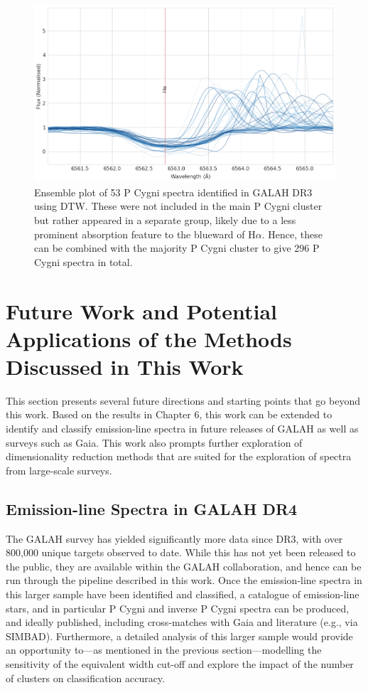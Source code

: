 \begin{figure}[!htb]
\centering
\includegraphics[scale=0.45]{figures/p cugni 2.png}
\caption{Ensemble plot of 53 P Cygni spectra identified in GALAH DR3 using DTW. These were not included in the main P Cygni cluster but rather appeared in a separate group, likely due to a less prominent absorption feature to the blueward of H$\alpha$. Hence, these can be combined with the majority P Cygni cluster to give 296 P Cygni spectra in total.}
\end{figure}


\section{Future Work and Potential Applications of the Methods Discussed in This Work}

This section presents several future directions and starting points that go beyond this work. Based on the results in Chapter 6, this work can be extended to identify and classify emission-line spectra in future releases of GALAH as well as surveys such as Gaia. This work also prompts further exploration of dimensionality reduction methods that are suited for the exploration of spectra from large-scale surveys. 

\subsection{Emission-line Spectra in GALAH DR4}

The GALAH survey has yielded significantly more data since DR3, with over 800,000 unique targets observed to date. While this has not yet been released to the public, they are available within the GALAH collaboration, and hence can be run through the pipeline described in this work. Once the emission-line spectra in this larger sample have been identified and classified, a catalogue of emission-line stars, and in particular P Cygni and inverse P Cygni spectra can be produced, and ideally published, including cross-matches with Gaia and literature (e.g., via SIMBAD). Furthermore, a detailed analysis of this larger sample would provide an opportunity to—as mentioned in the previous section—modelling the sensitivity of the equivalent width cut-off and explore the impact of the number of clusters on classification accuracy.


